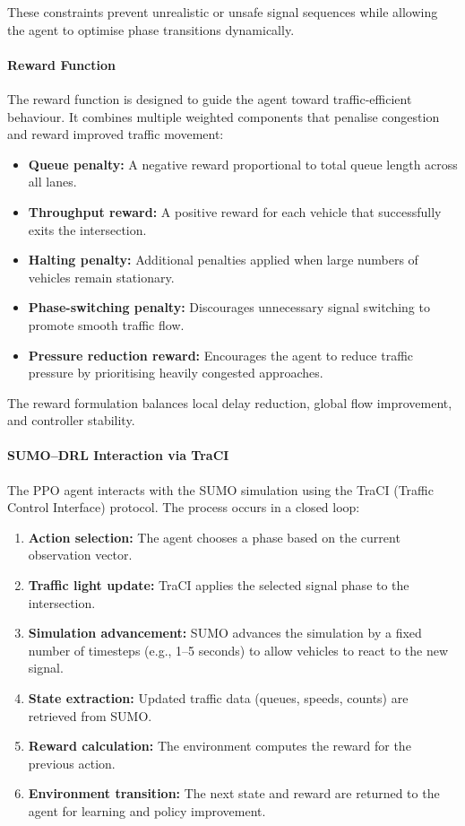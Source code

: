 \documentclass[11pt, a4paper]{report}
\begin{document}
These constraints prevent unrealistic or unsafe signal sequences while allowing the agent to optimise phase transitions dynamically.

\paragraph{Reward Function}

The reward function is designed to guide the agent toward traffic-efficient behaviour. It combines multiple weighted components that penalise congestion and reward improved traffic movement:

\begin{itemize}
    \item \textbf{Queue penalty:} A negative reward proportional to total queue length across all lanes.
    \item \textbf{Throughput reward:} A positive reward for each vehicle that successfully exits the intersection.
    \item \textbf{Halting penalty:} Additional penalties applied when large numbers of vehicles remain stationary.
    \item \textbf{Phase-switching penalty:} Discourages unnecessary signal switching to promote smooth traffic flow.
    \item \textbf{Pressure reduction reward:} Encourages the agent to reduce traffic pressure by prioritising heavily congested approaches.
\end{itemize}

The reward formulation balances local delay reduction, global flow improvement, and controller stability.

\paragraph{SUMO--DRL Interaction via TraCI}

The PPO agent interacts with the SUMO simulation using the TraCI (Traffic Control Interface) protocol. The process occurs in a closed loop:

\begin{enumerate}
    \item \textbf{Action selection:} The agent chooses a phase based on the current observation vector.
    \item \textbf{Traffic light update:} TraCI applies the selected signal phase to the intersection.
    \item \textbf{Simulation advancement:} SUMO advances the simulation by a fixed number of timesteps (e.g., 1--5 seconds) to allow vehicles to react to the new signal.
    \item \textbf{State extraction:} Updated traffic data (queues, speeds, counts) are retrieved from SUMO.
    \item \textbf{Reward calculation:} The environment computes the reward for the previous action.
    \item \textbf{Environment transition:} The next state and reward are returned to the agent for learning and policy improvement.
\end{enumerate}
\end{document}
